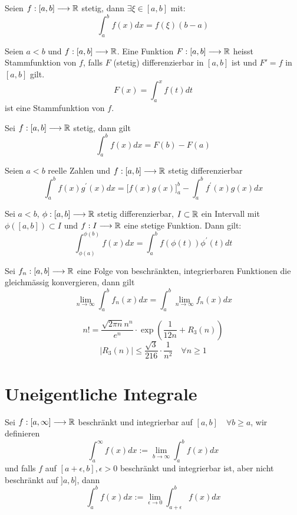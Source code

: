 \Satz[Mittelwertsatz] Seien $f : [a,b] \longrightarrow \mathbb{R}$ stetig, dann $\exists \xi \in [a,b]$ mit:
$$\int_a^b f(x) dx = f(\xi)(b-a)$$


\Satz[Stammfunktion] Seien $a < b$ und $f : [a,b] \longrightarrow \mathbb{R}$. Eine Funktion $F : [a,b] \longrightarrow \mathbb{R}$  heisst Stammfunktion von $f$, falls $F$ (stetig) differenzierbar in $[a,b]$ ist und $F' = f$ in $[a,b]$ gilt. \\
$$F(x) = \int_a^x f(t) dt$$ ist eine Stammfunktion von $f$.

\Satz[Fundamentalsatz] Sei $f : [a,b] \longrightarrow \mathbb{R}$ stetig, dann gilt
$$\int_a^b f(x) dx = F(b)-F(a)$$

 Seien $a < b$ reelle Zahlen und $f : [a,b] \longrightarrow \mathbb{R}$ stetig differenzierbar
$$
\int_{a}^{b} f(x) g^{\prime}(x) dx = \Big[f(x)g(x)\Big]_a^b - \int_{a}^{b} f^{\prime}(x) g(x) dx
$$

\Satz[Substitution] Sei $a<b$, $\phi : [a,b] \longrightarrow \mathbb{R}$ stetig differenzierbar, $I \subset \mathbb{R}$ ein Intervall mit $\phi([a,b]) \subset I$ und $f: I \longrightarrow \mathbb{R}$ eine stetige Funktion. Dann gilt:
$$
\int_{\phi(a)}^{\phi(b)} f(x) dx=\int_{a}^{b} f(\phi(t)) \phi^{\prime}(t) dt
$$

\Satz Sei $f_n : [a,b] \longrightarrow \mathbb{R}$ eine Folge von beschränkten, integrierbaren Funktionen die gleichmässig konvergieren, dann gilt
$$
\lim_{n \rightarrow \infty} \int_a^b f_n(x) dx = \int_a^b \lim_{n \rightarrow \infty} f_n(x) dx
$$

\Satz[Stirling] 
$$
n !=\frac{\sqrt{2 \pi n} n^{n}}{e^{n}} \cdot \exp \left(\frac{1}{12 n}+R_{3}(n)\right)
$$
$$
\left|R_{3}(n)\right| \leqslant \frac{\sqrt{3}}{216} \cdot \frac{1}{n^{2}} \quad \forall n \geqslant 1
$$

\section{Uneigentliche Integrale}

\Def Sei $f:[a,\infty] \longrightarrow \mathbb{R}$ beschränkt und integrierbar auf $[a,b] \quad \forall b \geq a$, wir definieren
$$\int_a^\infty f(x) dx := \lim_{b \rightarrow \infty} \int_a^b f(x) dx$$
und falls $f$ auf $[a+\epsilon,b], \epsilon>0$ beschränkt und integrierbar ist, aber nicht beschränkt auf $]a,b]$, dann
$$\int_a^b f(x) dx := \lim_{\epsilon \rightarrow 0} \int_{a+\epsilon}^b f(x) dx$$

